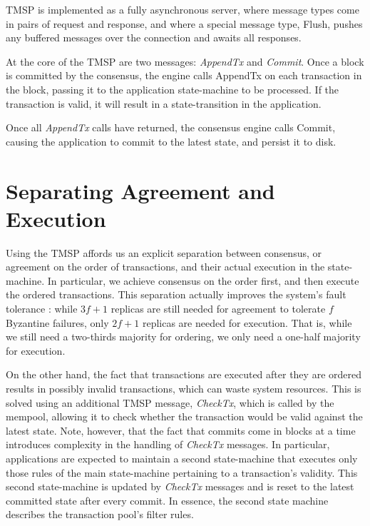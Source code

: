 TMSP is implemented as a fully asynchronous server, 
where message types come in pairs of request and response,
and where a special message type, Flush, pushes any buffered messages over the connection and awaits all responses.

At the core of the TMSP are two messages: \emph{AppendTx} and \emph{Commit}.
Once a block is committed by the consensus, 
the engine calls AppendTx on each transaction in the block, 
passing it to the application state-machine to be processed.
If the transaction is valid, it will result in a state-transition in the application.

Once all \emph{AppendTx} calls have returned, the consensus engine calls Commit,
causing the application to commit to the latest state, and persist it to disk.

\section{Separating Agreement and Execution}

Using the TMSP affords us an explicit separation between consensus, or agreement on the order of transactions, 
and their actual execution in the state-machine.
In particular, we achieve consensus on the order first, and then execute the ordered transactions.
This separation actually improves the system's fault tolerance \cite{yin2003separating}:
while $3f+1$ replicas are still needed for agreement to tolerate $f$ Byzantine failures, 
only $2f+1$ replicas are needed for execution.
That is, while we still need a two-thirds majority for ordering, we only need a one-half majority for execution.

On the other hand, the fact that transactions are executed after they are ordered results in possibly invalid transactions,
which can waste system resources. 
This is solved using an additional TMSP message, \emph{CheckTx}, which is called by the mempool,
allowing it to check whether the transaction would be valid against the latest state.
Note, however, that the fact that commits come in blocks at a time introduces complexity in the handling of \emph{CheckTx} messages.
In particular, applications are expected to maintain a second state-machine that executes only those rules of the main state-machine pertaining to a transaction's validity. 
This second state-machine is updated by \emph{CheckTx} messages and is reset to the latest committed state after every commit.
In essence, the second state machine describes the transaction pool's filter rules.

